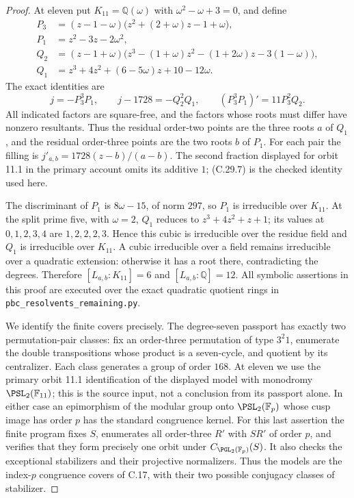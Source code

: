 \begin{proof}
At eleven put $K_{11}=\mathbb Q(\omega)$ with
$\omega^2-\omega+3=0$, and define
\[
 \begin{aligned}
 P_3&=(z-1-\omega)
            \bigl(z^2+(2+\omega)z-1+\omega\bigr),\\
 P_1&=z^2-3z-2\omega^2,\\
 Q_2&=(z-1+\omega)
       \bigl(z^3-(1+\omega)z^2-(1+2\omega)z-3(1-\omega)\bigr),\\
 Q_1&=z^3+4z^2+(6-5\omega)z+10-12\omega .
 \end{aligned}
 \tag{C.29.6}
\]
The exact identities are
\[
       j=-P_3^3P_1,\qquad
       j-1728=-Q_2^2Q_1,\qquad
       (P_3^3P_1)'=11P_3^2Q_2.
 \tag{C.29.7}
\]
All indicated factors are square-free, and the factors
whose roots must differ have nonzero resultants.
Thus the residual order-two points are the three
roots $a$ of $Q_1$, and the residual order-three
points are the two roots $b$ of $P_1$. For each
pair the filling is $j'_{a,b}=1728(z-b)/(a-b)$.
The second fraction displayed for orbit 11.1 in the
primary account omits its additive $1$; (C.29.7)
is the checked identity used here.

The discriminant of $P_1$ is $8\omega-15$, of
norm $297$, so $P_1$ is irreducible over $K_{11}$.
At the split prime five, with $\omega=2$, $Q_1$
reduces to $z^3+4z^2+z+1$; its values at
$0,1,2,3,4$ are $1,2,2,2,3$. Hence this cubic
is irreducible over the residue field and $Q_1$
is irreducible over $K_{11}$.
A cubic irreducible over a field remains irreducible
over a quadratic extension: otherwise it has a root
there, contradicting the degrees. Therefore
$[L_{a,b}:K_{11}]=6$ and $[L_{a,b}:\mathbb Q]=12$.
All symbolic assertions in this proof are executed
over the exact quadratic quotient rings in
\texttt{pbc\_resolvents\_\allowbreak remaining.py}.

We identify the finite covers precisely. The degree-seven
passport has exactly two permutation-pair classes:
fix an order-three permutation of type $3^2 1$,
enumerate the double transpositions whose product is
a seven-cycle, and quotient by its centralizer.
Each class generates a group of order $168$.
At eleven we use the primary orbit 11.1 identification
of the displayed model with monodromy
$\PSL_2(\mathbb F_{11})$; this is the source input,
not a conclusion from its passport alone.
In either case an epimorphism of the modular group
onto $\PSL_2(\mathbb F_p)$ whose cusp image has
order $p$ has the standard congruence kernel.
For this last assertion the finite program fixes
$S$, enumerates all order-three $R'$ with $SR'$
of order $p$, and verifies that they form precisely
one orbit under $C_{\PGL_2(\mathbb F_p)}(S)$.
It also checks the exceptional stabilizers and their
projective normalizers. Thus the models are the
index-$p$ congruence covers of C.17, with their two
possible conjugacy classes of stabilizer.


\end{proof}
